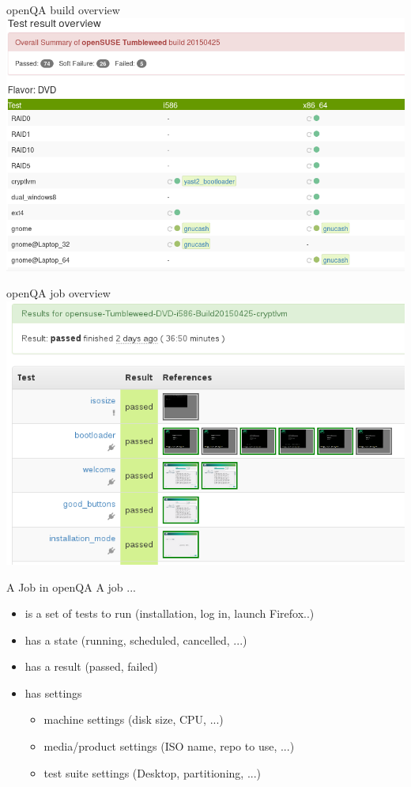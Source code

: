 \documentclass[
]{beamer}
\begin{document}
\begin{frame}{openQA build overview}
  \includegraphics[width=.8\paperwidth]{openqa-buildoverview.png}
\end{frame}

\begin{frame}{openQA job overview}
  \includegraphics[width=.8\paperwidth]{openqa-testresults.png}
\end{frame}

\begin{frame}{A Job in openQA}
  A job ...
  \begin{itemize}
    \item is a set of tests to run (installation, log in, launch Firefox..)
    \item has a state (running, scheduled, cancelled, ...)
    \item has a result (passed, failed)
    \item has settings
    \begin{itemize}
      \item machine settings (disk size, CPU, ...)
      \item media/product settings (ISO name, repo to use, ...)
      \item test suite settings (Desktop, partitioning, ...)
    \end{itemize}
  \end{itemize}
\end{frame}
\end{document}

